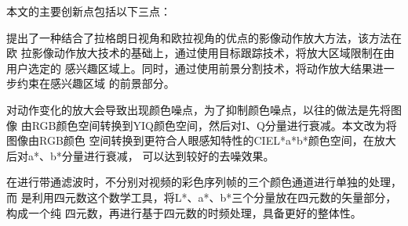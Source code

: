 本文的主要创新点包括以下三点：

\begin{compactenum}
\item 提出了一种结合了拉格朗日视角和欧拉视角的优点的影像动作放大方法，该方法在欧
  拉影像动作放大技术的基础上，通过使用目标跟踪技术，将放大区域限制在由用户选定的
  感兴趣区域上。同时，通过使用前景分割技术，将动作放大结果进一步约束在感兴趣区域
  的前景部分。
\item 对动作变化的放大会导致出现颜色噪点，为了抑制颜色噪点，以往的做法是先将图像
  由RGB颜色空间转换到YIQ颜色空间，然后对I、Q分量进行衰减。本文改为将图像由RGB颜色
  空间转换到更符合人眼感知特性的CIEL*a*b*颜色空间，在放大后对a*、b*分量进行衰减，
  可以达到较好的去噪效果。
\item 在进行带通滤波时，不分别对视频的彩色序列帧的三个颜色通道进行单独的处理，而
  是利用四元数这个数学工具，将L*、a*、b*三个分量放在四元数的矢量部分，构成一个纯
  四元数，再进行基于四元数的时频处理，具备更好的整体性。
\end{compactenum}







